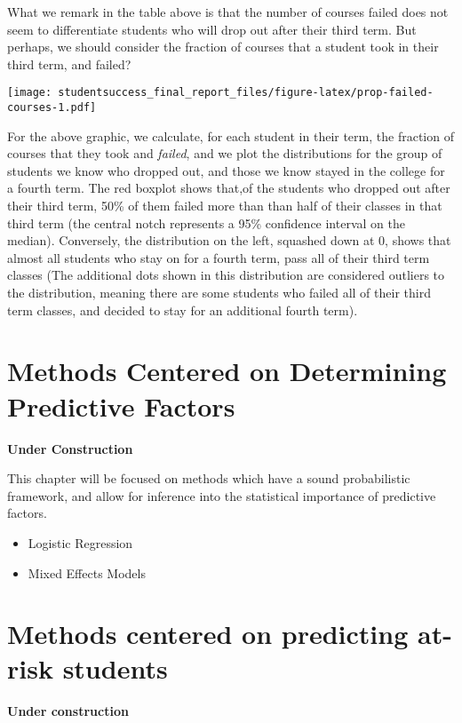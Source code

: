 \documentclass[]{book}
\providecommand{\tightlist}{%
  \setlength{\itemsep}{0pt}\setlength{\parskip}{0pt}}
\theoremstyle{definition}
\theoremstyle{definition}
\theoremstyle{remark}
\begin{document}
What we remark in the table above is that the number of courses failed
does not seem to differentiate students who will drop out after their
third term. But perhaps, we should consider the fraction of courses that
a student took in their third term, and failed?

\texttt{[image: studentsuccess\_final\_report\_files/figure-latex/prop-failed-courses-1.pdf]}

For the above graphic, we calculate, for each student in their term, the
fraction of courses that they took and \emph{failed}, and we plot the
distributions for the group of students we know who dropped out, and
those we know stayed in the college for a fourth term. The red boxplot
shows that,of the students who dropped out after their third term, 50\%
of them failed more than than half of their classes in that third term
(the central notch represents a 95\% confidence interval on the median).
Conversely, the distribution on the left, squashed down at 0, shows that
almost all students who stay on for a fourth term, pass all of their
third term classes (The additional dots shown in this distribution are
considered outliers to the distribution, meaning there are some students
who failed all of their third term classes, and decided to stay for an
additional fourth term).

\hypertarget{explanatory}{\chapter{Methods Centered on Determining
Predictive Factors}\label{explanatory}}

\textbf{Under Construction}

This chapter will be focused on methods which have a sound probabilistic
framework, and allow for inference into the statistical importance of
predictive factors.

\begin{itemize}
\tightlist
\item
  Logistic Regression
\item
  Mixed Effects Models
\end{itemize}

\hypertarget{predictive}{\chapter{Methods centered on predicting at-risk
students}\label{predictive}}

\textbf{Under construction}
\end{document}
